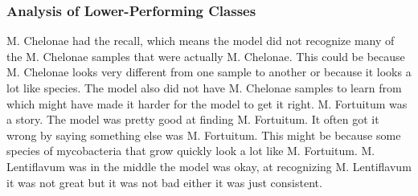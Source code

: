 \documentclass[journal,article,submit,pdftex,moreauthors]{Definitions/mdpi}
\begin{document}
\subsubsection{\textbf{Analysis of Lower-Performing Classes}}
M. Chelonae had the recall, which means the model did not recognize many of the M. Chelonae samples that were actually M. Chelonae. This could be because M. Chelonae looks very different from one sample to another or because it looks a lot like species. The model also did not have M. Chelonae samples to learn from which might have made it harder for the model to get it right. M. Fortuitum was a story. The model was pretty good at finding M. Fortuitum. It often got it wrong by saying something else was M. Fortuitum. This might be because some species of mycobacteria that grow quickly look a lot like M. Fortuitum. M. Lentiflavum was in the middle the model was okay, at recognizing M. Lentiflavum it was not great but it was not bad either it was just consistent.
\end{document}
